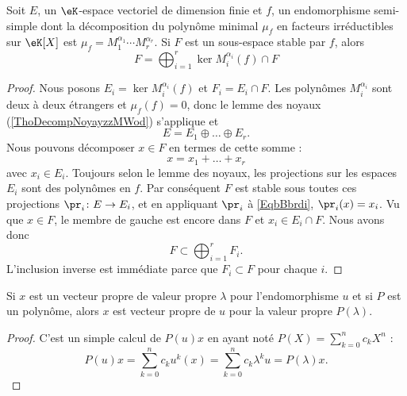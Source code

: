 \begin{corollary}   \label{CorKiSCkC}
    Soit \( E\), un \( \eK\)-espace vectoriel de dimension finie et \( f\), un endomorphisme semi-simple dont la décomposition du polynôme minimal \( \mu_f\) en facteurs irréductibles sur \( \eK[X]\) est \( \mu_f=M_1^{\alpha_1}\cdots M_r^{\alpha_r}\). Si \( F\) est un sous-espace stable par \( f\), alors
    \begin{equation}
        F=\bigoplus_{i=1}^r\ker M_i^{\alpha_i}(f)\cap F
    \end{equation}
\end{corollary}

\begin{proof}
    Nous posons \( E_i=\ker M_i^{\alpha_i}(f)\) et \( F_i=E_i\cap F\). Les polynômes \( M_i^{\alpha_i}\) sont deux à deux étrangers et \( \mu_f(f)=0\), donc le lemme des noyaux (\ref{ThoDecompNoyayzzMWod}) s'applique et
    \begin{equation}
        E=E_1\oplus\ldots\oplus E_r.
    \end{equation}
    Nous pouvons décomposer \( x\in F\) en termes de cette somme :
    \begin{equation}     \label{EqbBbrdi}
        x=x_1+\ldots +x_r
    \end{equation}
    avec \( x_i\in E_i\). Toujours selon le lemme des noyaux, les projections sur les espaces \( E_i\) sont des polynômes en \( f\). Par conséquent \( F\) est stable sous toutes ces projections \( \pr_i\colon E\to E_i\), et en appliquant \( \pr_i\) à \eqref{EqbBbrdi}, \( \pr_i(x)=x_i\). Vu que \( x\in F\), le membre de gauche est encore dans \( F\) et \( x_i\in E_i\cap F\). Nous avons donc
    \begin{equation}
        F\subset\bigoplus_{i=1}^rF_i.
    \end{equation}
    L'inclusion inverse est immédiate parce que \( F_i\subset F\) pour chaque \( i\).
\end{proof}

\begin{lemma}   \label{LemVISooHxMdbr}
    Si \( x\) est un vecteur propre de valeur propre \( \lambda\) pour l'endomorphisme \( u\) et si \( P\) est un polynôme, alors \( x\) est vecteur propre de \( u\) pour la valeur propre \( P(\lambda)\).
\end{lemma}

\begin{proof}
    C'est un simple calcul de \( P(u)x\) en ayant noté \( P(X)=\sum_{k=0}^nc_kX^n\) :
    \begin{equation}
        P(u)x=\sum_{k=0}^nc_ku^k(x)=\sum_{k=0}^nc_k\lambda^ku=P(\lambda)x.
    \end{equation}
\end{proof}

